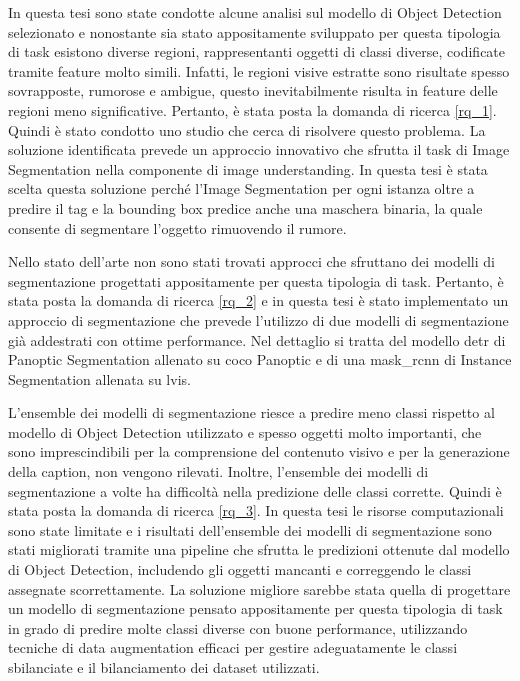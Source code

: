 In questa tesi sono state condotte alcune analisi sul modello di Object Detection selezionato e nonostante sia stato appositamente sviluppato per questa tipologia di task esistono diverse regioni, rappresentanti oggetti di classi diverse, codificate tramite feature molto simili. 
Infatti, le regioni visive estratte sono risultate spesso sovrapposte, rumorose e ambigue, questo inevitabilmente risulta in feature delle regioni meno significative. Pertanto, è stata posta la domanda di ricerca \ref{rq_1}. Quindi è stato condotto uno studio che cerca di risolvere questo problema. La soluzione identificata prevede un approccio innovativo che sfrutta il task di Image Segmentation nella componente di image understanding. In questa tesi è stata scelta questa soluzione perché l'Image Segmentation per ogni istanza oltre a predire il tag e la bounding box predice anche una maschera binaria, la quale consente di segmentare l'oggetto rimuovendo il rumore.


Nello stato dell'arte non sono stati trovati approcci che sfruttano dei modelli di segmentazione progettati appositamente per questa tipologia di task. Pertanto, è stata posta la domanda di ricerca \ref{rq_2} e in questa tesi è stato implementato un approccio di segmentazione che prevede l'utilizzo di due modelli di segmentazione già addestrati con ottime performance. Nel dettaglio si tratta del modello \acrshort{detr} di Panoptic Segmentation allenato su \acrshort{coco} Panoptic e di una \acrshort{mask_rcnn} di Instance Segmentation allenata su \acrshort{lvis}.


L'ensemble dei modelli di segmentazione riesce a predire meno classi rispetto al modello di Object Detection utilizzato e spesso oggetti molto importanti, che sono imprescindibili per la comprensione del contenuto visivo e per la generazione della caption, non vengono rilevati. Inoltre, l'ensemble dei modelli di segmentazione a volte ha difficoltà nella predizione delle classi corrette.
Quindi è stata posta la domanda di ricerca \ref{rq_3}.
In questa tesi le risorse computazionali sono state limitate e i risultati dell'ensemble dei modelli di segmentazione sono stati migliorati tramite una pipeline che sfrutta le predizioni ottenute dal modello di Object Detection, includendo gli oggetti mancanti e correggendo le classi assegnate scorrettamente.
La soluzione migliore sarebbe stata quella di progettare un modello di segmentazione pensato appositamente per questa tipologia di task in grado di predire molte classi diverse con buone performance, utilizzando tecniche di data augmentation efficaci per gestire adeguatamente le classi sbilanciate e il bilanciamento dei dataset utilizzati.%

